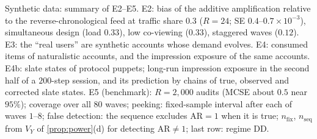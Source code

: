 \begin{table}[tbp]
\centering
\caption{Synthetic data: summary of E2--E5. E2: bias of the additive amplification relative to the reverse-chronological feed at traffic share $0.3$ ($R=24$; SE $0.4$--$0.7\times10^{-3}$), simultaneous design (load $0.33$), low co-viewing ($0.33$), staggered waves ($0.12$). E3: the ``real users'' are synthetic accounts whose demand evolves. E4: consumed items of naturalistic accounts, and the impression exposure of the same accounts. E4b: slate states of protocol puppets; long-run impression exposure in the second half of a $200$-step session, and its prediction by chains of true, observed and corrected slate states. E5 (benchmark): $R=2{,}000$ audits (MCSE about $0.5$ near $95\%$); coverage over all $80$ waves; peeking: fixed-sample interval after each of waves $1$--$8$; false detection: the sequence excludes $\mathrm{AR}=1$ when it is true; $n_{\mathrm{fix}}$, $n_{\mathrm{seq}}$ from $V_Y$ of \cref{prop:power}(d) for detecting $\mathrm{AR}\ne1$; last row: regime DD.}\label{tab:sim-designs}
\footnotesize
\setlength{\tabcolsep}{3pt}
\simfit{}
\end{table}
